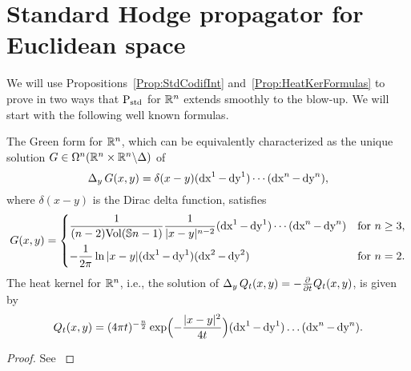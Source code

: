 \documentclass[\MainFolder/Text.tex]{subfiles}
\begin{document}
\section{Standard Hodge propagator for Euclidean space}\label{Sec:HeatRN}
We will use Propositions~\ref{Prop:StdCodifInt} and~\ref{Prop:HeatKerFormulas} to prove in two ways that $\mathrm{P}_{\mathrm{std}}$ for $\mathbb{R}^n$ extends smoothly to the blow-up. We will start with the following well known formulas.
\begin{Proposition}\label{Prop:GreenKernelRn}
The Green form for $\mathbb{R}^n$, which can be equivalently characterized as the unique solution $G\in \Omega^n(\mathbb{R}^n\times\mathbb{R}^n\backslash\Delta)$ of
\begin{equation}\label{Eq:GrRn}
\operatorname{\Delta}_y G(x,y) = \delta(x-y)(\operatorname{dx}^1-\operatorname{dy}^1)\dotsb(\operatorname{dx}^n-\operatorname{dy}^n),
\end{equation}
where $\delta(x-y)$ is the Dirac delta function, satisfies
$$ G(x,y) = \begin{cases}
\displaystyle\frac{1}{(n-2) \mathrm{Vol}(\mathbb{S}{n-1})} \frac{1}{|x-y|^{n-2}}(\operatorname{dx}^1 - \operatorname{dy}^1) \dotsb (\operatorname{dx}^n - \operatorname{dy}^n) & \text{for }n\ge 3, \\[1em]
-\dfrac{1}{2\pi}\ln |x-y|(\operatorname{dx}^1 - \operatorname{dy}^1)(\operatorname{dx}^2 - \operatorname{dy}^2)& \text{for }n=2.
\end{cases} $$
The heat kernel for $\mathbb{R}^n$, i.e., the solution of $\operatorname{\Delta}_y Q_t(x,y) = -\frac{\partial}{\partial t}Q_t(x,y)$,  is given by
\begin{equation}\label{Eq:EuclidHeatKer}
Q_t(x,y) = (4\pi t)^{-\frac{n}{2}}\exp\Bigl(-\frac{|x-y|^2}{4t}\Bigr) (\operatorname{dx}^1 - \operatorname{dy}^1)\ldots (\operatorname{dx}^n-\operatorname{dy}^n).
\end{equation}
\end{Proposition}
\begin{proof}
See \cite{BGV}
\end{proof}
\end{document}
